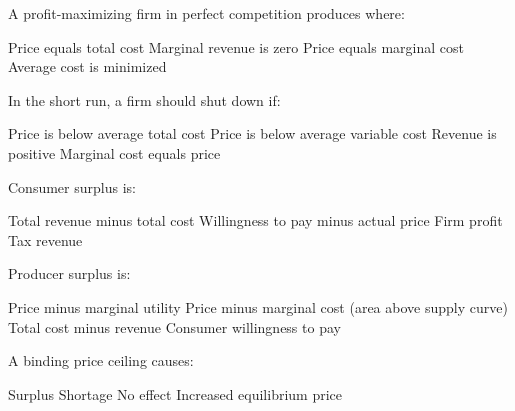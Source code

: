 \documentclass[12pt]{exam}
\begin{document}
\begin{questions}
    \begin{mcquestion}[2]
        A profit-maximizing firm in perfect competition produces where:
        \begin{choices}
            \choice Price equals total cost
            \choice Marginal revenue is zero
            \CorrectChoice Price equals marginal cost
            \choice Average cost is minimized
        \end{choices}
    \end{mcquestion}

    \begin{mcquestion}[2]
        In the short run, a firm should shut down if:
        \begin{choices}
            \choice Price is below average total cost
            \CorrectChoice Price is below average variable cost
            \choice Revenue is positive
            \choice Marginal cost equals price
        \end{choices}
    \end{mcquestion}

    \begin{mcquestion}[2]
        Consumer surplus is:
        \begin{choices}
            \choice Total revenue minus total cost
            \CorrectChoice Willingness to pay minus actual price
            \choice Firm profit
            \choice Tax revenue
        \end{choices}
    \end{mcquestion}

    \begin{mcquestion}[2]
        Producer surplus is:
        \begin{choices}
            \choice Price minus marginal utility
            \CorrectChoice Price minus marginal cost (area above supply curve)
            \choice Total cost minus revenue
            \choice Consumer willingness to pay
        \end{choices}
    \end{mcquestion}

    \begin{mcquestion}[2]
        A binding price ceiling causes:
        \begin{choices}
            \choice Surplus
            \CorrectChoice Shortage
            \choice No effect
            \choice Increased equilibrium price
        \end{choices}
    \end{mcquestion}


\end{questions}
\end{document}
